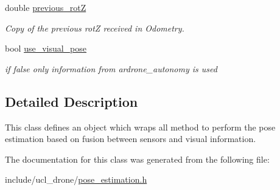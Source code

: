 \begin{DoxyCompactItemize}
double \hyperlink{classPoseEstimator_a9f7fd73224b194ae6a79d11d4d423a1c}{previous\+\_\+rotZ}
\begin{DoxyCompactList}\small\item\em Copy of the previous rotZ received in Odometry. \end{DoxyCompactList}\item 
\mbox{\label{classPoseEstimator_ac666314fac74836d4f1fbc8ea1f52a28}} 
bool \hyperlink{classPoseEstimator_ac666314fac74836d4f1fbc8ea1f52a28}{use\+\_\+visual\+\_\+pose}
\begin{DoxyCompactList}\small\item\em if false only information from ardrone\+\_\+autonomy is used \end{DoxyCompactList}\end{DoxyCompactItemize}


\subsection{Detailed Description}
This class defines an object which wraps all method to perform the pose estimation based on fusion between sensors and visual information. 

The documentation for this class was generated from the following file\+:\begin{DoxyCompactItemize}
\item 
include/ucl\+\_\+drone/\hyperlink{pose__estimation_8h}{pose\+\_\+estimation.\+h}\end{DoxyCompactItemize}
